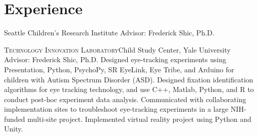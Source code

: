 \documentclass[11pt,letterpaper,roman]{moderncv} %
\begin{document}

\section{Experience}


{\newline{}Seattle Children's Research Institute}{}
{
Advisor: Frederick Shic, Ph.D.
}

{\newline{}\textsc{Technology Innovation Laboratory}}{Child Study Center, Yale University}{}
{
Advisor: Frederick Shic, Ph.D.
\newline{}
Designed eye-tracking experiments using Presentation, Python, PsychoPy, SR EyeLink, Eye Tribe, and Arduino for children with Autism Spectrum Disorder (ASD). 
Designed fixation identification algorithms for eye tracking technology, and use C++, Matlab, Python, and R to conduct post-hoc experiment data analysis.
Communicated with collaborating implementation sites to troubleshoot eye-tracking experiments in a large NIH-funded multi-site project.
Implemented virtual reality project using Python and Unity. 
}
\end{document}
